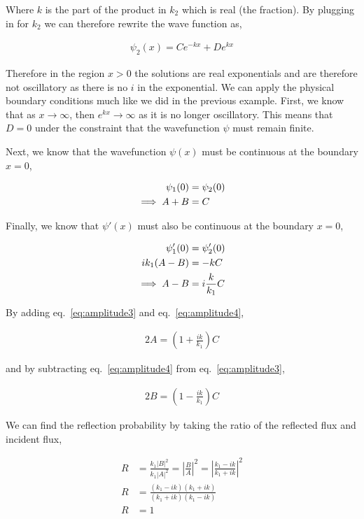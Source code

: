 \documentclass[11pt]{amsart}
\begin{document}
Where $k$ is the part of the product in $k_2$ which is real (the fraction). By plugging in for $k_2$ we can therefore rewrite the wave function as,

\begin{align*}
  \psi_2(x) = C e^{-kx} + D e^{kx}
\end{align*}

Therefore in the region $x > 0$ the solutions are real exponentials and are therefore not oscillatory as there is no $i$ in the exponential. We can apply the physical boundary conditions much like we did in the previous example. First, we know that as $x \to \infty$, then $e^{kx} \to \infty$ as it is no longer oscillatory. This means that $D = 0$ under the constraint that the wavefunction $\psi$ must remain finite.

Next, we know that the wavefunction $\psi(x)$ must be continuous at the boundary $x = 0$,

\begin{align}
  \label{eq:amplitude3}
  \psi_1(0) &= \psi_2(0) \notag\\
  \implies A + B &= C
\end{align}

Finally, we know that $\psi'(x)$ must also be continuous at the boundary $x = 0$,

\begin{align}
  \label{eq:amplitude4}
  \psi'_1(0) &= \psi'_2(0) \notag\\
  ik_1(A - B) &= -kC \notag\\
  \implies A - B &= i \frac{k}{k_1} C
\end{align}

By adding eq.~\ref{eq:amplitude3} and eq.~\ref{eq:amplitude4},

\begin{align*}
  2A = \left(1 + \frac{ik}{k_1}\right) C
\end{align*}

and by subtracting eq.~\ref{eq:amplitude4} from eq.~\ref{eq:amplitude3},

\begin{align*}
  2B = \left(1 - \frac{ik}{k_1}\right) C
\end{align*}

We can find the reflection probability by taking the ratio of the reflected flux and incident flux,

\begin{align*}
  R &= \frac{k_1 {|B|}^2}{k_1 {|A|}^2} = {|\frac{B}{A}|}^2 = {\left|\frac{k_1 - ik}{k_1 + ik}\right|}^2 \\
  R &= \frac{(k_1 - ik) (k_1 + ik)}{(k_1 + ik) (k_1 - ik)} \\
  R &= 1
\end{align*}
\end{document}
